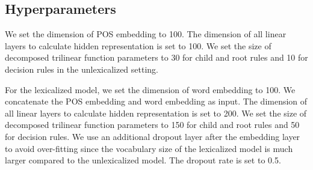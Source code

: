\documentclass[11pt]{article}
\begin{document}
\subsection{Hyperparameters}
We set the dimension of POS embedding to 100. The dimension of all linear layers to calculate hidden representation is set to 100. We set the size of decomposed trilinear function parameters to 30 for child and root rules and 10 for decision rules in the unlexicalized setting. 

For the lexicalized model, we set the dimension of word embedding to 100. We concatenate the POS embedding and word embedding as input. The dimension of all linear layers to calculate hidden representation is set to 200.  We set the size of decomposed trilinear function parameters to 150 for child and root rules and 50 for decision rules. We use an additional dropout layer after the embedding layer to avoid over-fitting since the vocabulary size of the lexicalized model is much larger compared to the unlexicalized model. The dropout rate is set to 0.5.
\end{document}
